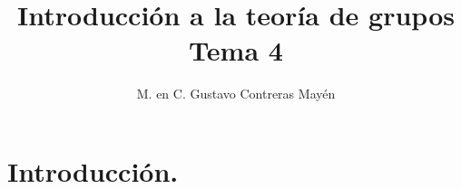 
\usepackage{arydshln}
\title{Introducción a la teoría de grupos \\ {\large Tema 4}\vspace{-3ex}}
\author{M. en C. Gustavo Contreras Mayén}
\date{ }

\pagestyle{fancy}
\fancyhf{}
\lhead{\leftmark}
\rfoot{\thepage}
\setlength{\headheight}{16pt}%

\def\changemargin#1#2{\list{}{\rightmargin#2\leftmargin#1}\item[]}
\let\endchangemargin=\endlist 



\maketitle
\fontsize{14}{14}\selectfont
\tableofcontents
\newpage

\section{Introducción.}

